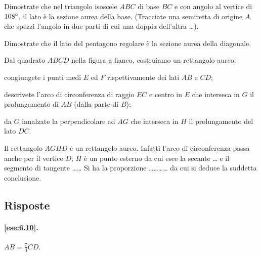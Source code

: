 \begin{esercizio}
\label{ese:6.110}
Dimostrate che nel triangolo isoscele $ABC$ di base $BC$ e con angolo al vertice di $108{}^{\circ}$, il lato è la sezione aurea della base. (Tracciate una semiretta di origine $A$ che spezzi l'angolo in due parti di cui una doppia dell'altra \ldots{}).
\end{esercizio}

\begin{esercizio}
\label{ese:6.111}
Dimostrate che il lato del pentagono regolare è la sezione aurea della diagonale.
\end{esercizio}

\noindent\begin{minipage}{0.7\textwidth}\parindent15pt
\begin{esercizio}
\label{ese:6.112}
Dal quadrato $ABCD$ nella figura a fianco, costruiamo un rettangolo aureo:
\begin{enumerate*}
\item congiungete i punti medi $E$ ed $F$ rispettivamente dei lati $AB$ e $CD$;
\item descrivete l'arco di circonferenza di raggio $EC$ e centro in $E$ che interseca in $G$ il prolungamento di $AB$ (dalla parte di $B$);
\item da $G$ innalzate la perpendicolare ad $AG$ che interseca in $H$ il prolungamento del lato $DC$.
\end{enumerate*}
Il rettangolo $AGHD$ è un rettangolo aureo. Infatti l'arco di circonferenza passa anche per il vertice $D$; $H$ è un punto esterno da cui esce la secante \ldots{} e il segmento di tangente \ldots\ldots{}
Si ha la proporzione \ldots\ldots\ldots\ldots{} da cui si deduce la suddetta conclusione.
\end{esercizio}
\end{minipage}\hfil
\begin{minipage}{0.3\textwidth}
	\centering
\end{minipage}


\subsection{Risposte}

\begingroup
\hypersetup{linkcolor=black}

\paragraph{\ref{ese:6.10}.}
$AB=\frac{7}{3}CD$.

